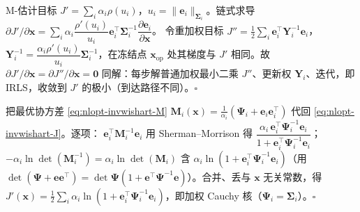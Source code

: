 \begin{derivation}
M-估计目标 $J'=\sum_i\alpha_i\rho(u_i)$，$u_i=\|\mathbf{e}_i\|_{\boldsymbol{\Sigma}_i}$。链式求导
$\partial J'/\partial\mathbf{x}=\sum_i\alpha_i\dfrac{\rho'(u_i)}{u_i}\mathbf{e}_i^\top\boldsymbol{\Sigma}_i^{-1}\dfrac{\partial\mathbf{e}_i}{\partial\mathbf{x}}$。
令重加权目标 $J''=\tfrac12\sum_i\mathbf{e}_i^\top\mathbf{Y}_i^{-1}\mathbf{e}_i$，$\mathbf{Y}_i^{-1}=\dfrac{\alpha_i\rho'(u_i)}{u_i}\boldsymbol{\Sigma}_i^{-1}$，在冻结点 $\mathbf{x}_{\mathrm{op}}$ 处其梯度与 $J'$ 相同。故 $\partial J'/\partial\mathbf{x}=\partial J''/\partial\mathbf{x}=\mathbf{0}$ 同解：每步解普通加权最小二乘 $J''$、更新权 $\mathbf{Y}_i$、迭代，即 IRLS，收敛到 $J'$ 的极小（到达路径不同）。\hfill$\square$
\end{derivation}

\begin{derivation}[鲁棒 $=$ 逆 Wishart 先验 MAP（\cref{eq:nlopt-robust-cauchy}）]
把最优协方差 \cref{eq:nlopt-invwishart-M} $\mathbf{M}_i(\mathbf{x})=\tfrac1{\alpha_i}(\boldsymbol{\Psi}_i+\mathbf{e}_i\mathbf{e}_i^\top)$ 代回 \cref{eq:nlopt-invwishart-J}。逐项：
$\mathbf{e}_i^\top\mathbf{M}_i^{-1}\mathbf{e}_i$ 用 Sherman--Morrison 得 $\dfrac{\alpha_i\,\mathbf{e}_i^\top\boldsymbol{\Psi}_i^{-1}\mathbf{e}_i}{1+\mathbf{e}_i^\top\boldsymbol{\Psi}_i^{-1}\mathbf{e}_i}$；$-\alpha_i\ln\det(\mathbf{M}_i^{-1})=\alpha_i\ln\det(\mathbf{M}_i)$ 含 $\alpha_i\ln(1+\mathbf{e}_i^\top\boldsymbol{\Psi}_i^{-1}\mathbf{e}_i)$（用 $\det(\boldsymbol{\Psi}+\mathbf{e}\mathbf{e}^\top)=\det\boldsymbol{\Psi}(1+\mathbf{e}^\top\boldsymbol{\Psi}^{-1}\mathbf{e})$）。合并、丢与 $\mathbf{x}$ 无关常数，得 $J'(\mathbf{x})=\tfrac12\sum_i\alpha_i\ln(1+\mathbf{e}_i^\top\boldsymbol{\Psi}_i^{-1}\mathbf{e}_i)$，即加权 Cauchy 核（$\boldsymbol{\Psi}_i=\boldsymbol{\Sigma}_i$）。\hfill$\square$
\end{derivation}

